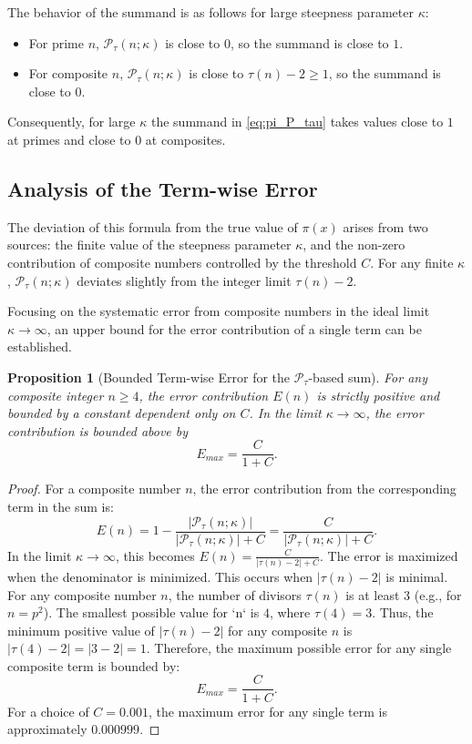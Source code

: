 \documentclass[11pt,a4paper]{amsart}
\theoremstyle{plain}
\newtheorem{proposition}[theorem]{Proposition}
\theoremstyle{definition}
\theoremstyle{remark}
\begin{document}
The behavior of the summand is as follows for large steepness parameter $\kappa$:
\begin{itemize}
    \item For prime $n$, $\mathcal{P}_{\tau}(n; \kappa)$ is close to $0$, so the summand is close to $1$.
    \item For composite $n$, $\mathcal{P}_{\tau}(n; \kappa)$ is close to $\tau(n)-2 \ge 1$, so the summand is close to $0$.
\end{itemize}
Consequently, for large $\kappa$ the summand in \eqref{eq:pi_P_tau} takes values close to $1$ at primes and close to $0$ at composites.

\subsection{Analysis of the Term-wise Error}
The deviation of this formula from the true value of $\pi(x)$ arises from two sources: the finite value of the steepness parameter $\kappa$, and the non-zero contribution of composite numbers controlled by the threshold $C$. For any finite $\kappa$, $\mathcal{P}_{\tau}(n; \kappa)$ deviates slightly from the integer limit $\tau(n)-2$.

Focusing on the systematic error from composite numbers in the ideal limit $\kappa\to\infty$, an upper bound for the error contribution of a single term can be established.

\begin{proposition}[Bounded Term-wise Error for the $\mathcal{P}_{\tau}$-based sum]
For any composite integer $n \ge 4$, the error contribution $E(n)$ is strictly positive and bounded by a constant dependent only on $C$. In the limit $\kappa\to\infty$, the error contribution is bounded above by
\[ E_{max} = \frac{C}{1+C}. \]
\end{proposition}

\begin{proof}
For a composite number $n$, the error contribution from the corresponding term in the sum is:
\[ E(n) = 1 - \frac{|\mathcal{P}_{\tau}(n; \kappa)|}{|\mathcal{P}_{\tau}(n; \kappa)| + C} = \frac{C}{|\mathcal{P}_{\tau}(n; \kappa)| + C}. \]
In the limit $\kappa\to\infty$, this becomes $E(n) = \frac{C}{|\tau(n)-2| + C}$.
The error is maximized when the denominator is minimized. This occurs when $|\tau(n)-2|$ is minimal. For any composite number $n$, the number of divisors $\tau(n)$ is at least 3 (e.g., for $n=p^2$). The smallest possible value for `n` is $4$, where $\tau(4)=3$. Thus, the minimum positive value of $|\tau(n)-2|$ for any composite $n$ is $|\tau(4)-2| = |3-2|=1$.
Therefore, the maximum possible error for any single composite term is bounded by:
\[ E_{max} = \frac{C}{1+C}. \]
For a choice of $C=0.001$, the maximum error for any single term is approximately $0.000999$.
\end{proof}
\end{document}
